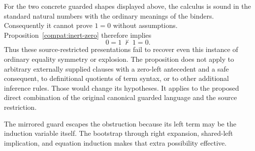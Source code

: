 For the two concrete guarded shapes displayed above, the calculus is
sound in the standard natural numbers with the ordinary meanings of
the binders. Consequently it cannot prove $1=0$ without assumptions.
Proposition~\ref{compat:inert-zero} therefore implies
\[
                      0=1\ \nvdash\ 1=0.
\]
Thus these source-restricted presentations fail to recover even this
instance of ordinary equality symmetry or explosion. The proposition
does not apply to arbitrary externally supplied clauses with a
zero-left antecedent and a safe consequent, to definitional quotients
of term syntax, or to other additional inference rules. Those would
change its hypotheses. It applies to the proposed direct combination
of the original canonical guarded language and the source restriction.

The mirrored guard escapes the obstruction because its left term may
be the induction variable itself. The bootstrap through right expansion,
shared-left implication, and equation induction makes that extra
possibility effective.
